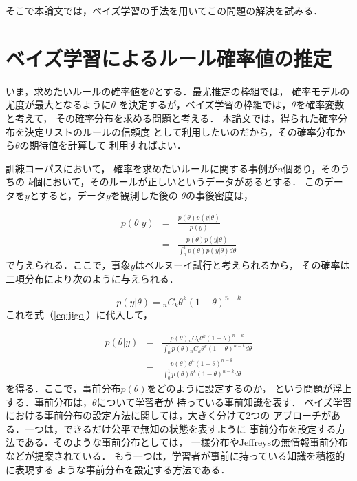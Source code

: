 そこで本論文では，ベイズ学習の手法を用いてこの問題の解決を試みる．

\section{ベイズ学習によるルール確率値の推定}

いま，求めたいルールの確率値を$\theta$とする．最尤推定の枠組では，
確率モデルの尤度が最大となるように$\theta$
を決定するが，ベイズ学習の枠組では，$\theta$を確率変数と考えて，
その確率分布を求める問題と考える．
本論文では，得られた確率分布を決定リストのルールの信頼度
として利用したいのだから，その確率分布から$\theta$の期待値を計算して
利用すればよい．

訓練コーパスにおいて，
確率を求めたいルールに関する事例が$n$個あり，そのうちの
$k$個において，そのルールが正しいというデータがあるとする．
このデータを$y$とすると，データ$y$を観測した後の
$\theta$の事後密度は，

\begin{eqnarray}
	p(\theta | y) &=& \frac{p(\theta)p(y|\theta)}{p(y)}  \\
\label{eq:jigo}
	&=& \frac{p(\theta)p(y|\theta)}{\int_0^1 {p(\theta)p(y|\theta)} d\theta}
\end{eqnarray}
で与えられる．ここで，事象$y$はベルヌーイ試行と考えられるから，
その確率は二項分布により次のように与えられる．

\begin{equation}
	p(y|\theta) = {}_n C_k \theta^k (1-\theta)^{n-k}
\end{equation}
これを式（\ref{eq:jigo}）に代入して，

\begin{eqnarray}
	p(\theta | y) &=& \frac{p(\theta){}_n C_k \theta^k (1-\theta)^{n-k}}{\int_0^1 {p(\theta){}_n C_k \theta^k (1-\theta)^{n-k}} d\theta} \\
	&=& \frac{p(\theta)\theta^k (1-\theta)^{n-k}}{\int_0^1 {p(\theta)\theta^k (1-\theta)^{n-k}} d\theta}
\label{eq:post}
\end{eqnarray}
を得る．ここで，事前分布$p(\theta)$をどのように設定するのか，
という問題が浮上する．事前分布は，$\theta$について学習者が
持っている事前知識を表す．
ベイズ学習における事前分布の設定方法に関しては，大きく分けて2つの
アプローチがある．一つは，できるだけ公平で無知の状態を表すように
事前分布を設定する方法である．そのような事前分布としては，
一様分布やJeffreysの無情報事前分布などが提案されている\cite{繁桝:ベイズ}．
もう一つは，学習者が事前に持っている知識を積極的に表現する
ような事前分布を設定する方法である．

